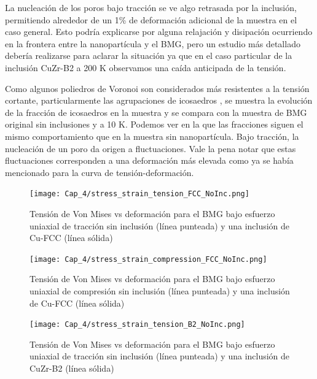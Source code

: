 La nucleación de los poros bajo tracción se ve algo retrasada por la inclusión, permitiendo alrededor de un 1\% de deformación adicional de la muestra en el caso general. Esto podría explicarse por alguna relajación y disipación ocurriendo en la frontera entre la nanopartícula y el BMG, pero un estudio más detallado debería realizarse para aclarar la situación ya que en el caso particular de la inclusión CuZr-B2 a 200 K observamos una caída anticipada de la tensión.

Como algunos poliedros de Voronoi son considerados más resistentes a la tensión cortante, particularmente las agrupaciones de icosaedros \citep{cheng08}, se muestra la evolución de la fracción de icosaedros en la muestra y se compara con la muestra de BMG original sin inclusiones y a 10 K. Podemos ver en la  que las fracciones siguen el mismo comportamiento que en la muestra sin nanopartícula. Bajo tracción, la nucleación de un poro da origen a fluctuaciones. Vale la pena notar que estas fluctuaciones corresponden a una deformación más elevada como ya se había mencionado para la curva de tensión-deformación.

\begin{figure}[htp]
\centering
\texttt{[image: Cap\_4/stress\_strain\_tension\_FCC\_NoInc.png]}
\caption[Von Mises vs deformación en tracción. Inclusión Cu-FCC]{Tensión de Von Mises vs deformación para el BMG bajo esfuerzo uniaxial de tracción sin inclusión (línea punteada) y una inclusión de Cu-FCC (línea sólida)}
\label{C4:fg:fcc_vm_tension}
\end{figure}

\begin{figure}[htp]
\centering
\texttt{[image: Cap\_4/stress\_strain\_compression\_FCC\_NoInc.png]}
\caption[Von Mises vs deformación en compresión. Inclusión de Cu-FCC]{Tensión de Von Mises vs deformación para el BMG bajo esfuerzo uniaxial de compresión sin inclusión (línea punteada) y una inclusión de Cu-FCC (línea sólida)}
\label{C4:fg:fcc_vm_compression}
\end{figure}

\begin{figure}[htp]
\centering
\texttt{[image: Cap\_4/stress\_strain\_tension\_B2\_NoInc.png]}
\caption[Von Mises vs deformación en tracción. Inclusión de CuZr-B2]{Tensión de Von Mises vs deformación para el BMG bajo esfuerzo uniaxial de tracción sin inclusión (línea punteada) y una inclusión de CuZr-B2 (línea sólida)}
\label{C4:fg:b2_vm_tension}
\end{figure}

